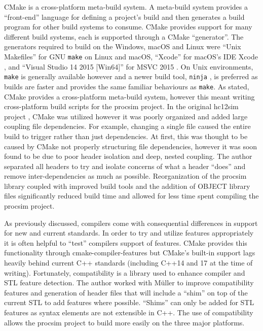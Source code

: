CMake \cite{Kitware:CMake} is a cross-platform meta-build system. A meta-build system provides a ``front-end'' language for defining a project's build and then generates a build program for other build systems to consume. CMake provides support for many different build systems, each is supported through a CMake ``generator''. The generators required to build on the Windows, macOS and Linux were ``Unix Makefiles'' for GNU \verb|make| \cite{GNU:Make} on Linux and macOS, ``Xcode'' for macOS's IDE Xcode \cite{Apple:Xcode}, and ``Visual Studio 14 2015 [Win64]'' for MSVC 2015 \cite{CMake:Generators}. On Unix environments, \verb|make| is generally available however and a newer build tool, \verb|ninja| \cite{NinjaBuild}, is preferred as builds are faster and provides the same familiar behaviours as \verb|make|. As stated, CMake provides a cross-platform meta-build system, however this meant writing cross-platform build scripts for the procsim project. In the original hc12sim project \cite{Brightwell2013}, CMake was utilized however it was poorly organized and added large coupling file dependencies. For example, changing a single file caused the entire build to trigger rather than just dependencies. At first, this was thought to be caused by CMake not properly structuring file dependencies, however it was soon found to be due to poor header isolation and deep, nested coupling. The author separated all headers to try and isolate concerns of what a header ``does'' and remove inter-dependencies as much as possible. Reorganization of the procsim library coupled with improved build tools and the addition of OBJECT library files \cite{CMake:add_library} significantly reduced build time and allowed for less time spent compiling the procsim project. 

As previously discussed, compilers come with consequential differences in support for new and current standards. In order to try and utilize features appropriately it is often helpful to ``test'' compilers support of features. CMake provides this functionality through cmake-compiler-features \cite{CMake:compile-features} but CMake's built-in support lags heavily behind current C++ standards (including C++14 and 17 at the time of writing). Fortunately, compatibility \cite{CMakeCompatibility} is a library used to enhance compiler and STL feature detection. The author worked with M\"uller to improve compatibility features and generation of header files that will include a ``shim'' on top of the current STL to add features where possible. ``Shims'' can only be added for STL features as syntax elements are not extensible in C++. The use of compatibility allows the procsim project to build more easily on the three major platforms. 

